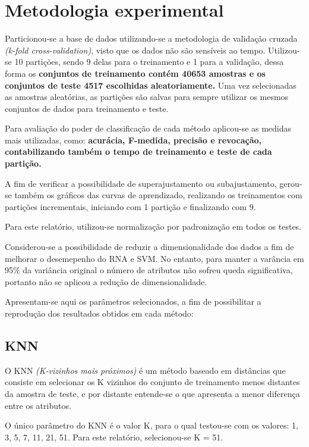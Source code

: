 \section{Metodologia experimental}
\label{sec:metodologia}

Particionou-se a base de dados utilizando-se a metodologia de validação cruzada \emph{(k-fold cross-validation)}, visto que os dados não são sensíveis ao tempo. Utilizou-se 10 partições, sendo 9 delas para o treinamento e 1 para a validação, dessa forma os \textbf{conjuntos de treinamento contém 40653 amostras e os conjuntos de teste 4517 escolhidas aleatoriamente.} Uma vez selecionadas as amostras aleatórias, as partições são salvas para sempre utilizar os mesmos conjuntos de dados para treinamento e teste.

Para avaliação do poder de classificação de cada método aplicou-se as medidas mais utilizadas, como: \textbf{acurácia, F-medida, precisão e revocação, contabilizando também o tempo de treinamento e teste de cada partição.}

A fim de verificar a possibilidade de superajustamento ou subajustamento, gerou-se também os gráficos das curvas de aprendizado, realizando os treinamentos com partições incrementais, iniciando com 1 partição e finalizando com 9.

Para este relatório, utilizou-se normalização por padronização em todos os testes.

Considerou-se a possibilidade de reduzir a dimensionalidade dos dados a fim de melhorar o desemepenho do RNA e SVM.  No entanto, para manter a varância em 95\% da variância original o número de atributos não sofreu queda significativa, portanto não se aplicou a redução de dimensionalidade.

Apresentam-se aqui os parâmetros selecionados, a fim de possibilitar a reprodução dos resultados obtidos em cada método:

\subsection{KNN}

O KNN \emph{(K-vizinhos mais próximos)} é um método baseado em distâncias que consiste em selecionar os K vizinhos do conjunto de treinamento menos distantes da amostra de teste, e por distante entende-se o que apresenta a menor diferença entre os atributos.

O único parâmetro do KNN é o valor K, para o qual testou-se com os valores: 1, 3, 5, 7, 11, 21, 51. Para este relatório, selecionou-se K = 51.

